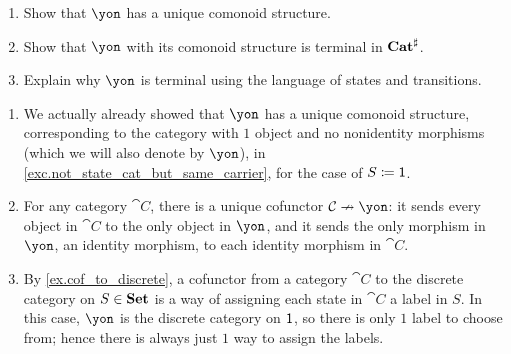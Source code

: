 \documentclass[Book-Poly]{subfiles}
\begin{document}
\begin{exercise}
\begin{enumerate}
	\item Show that $\yon$ has a unique comonoid structure.
	\item Show that $\yon$ with its comonoid structure is terminal in $\mathbf{Cat}^\sharp$.
	\item Explain why $\yon$ is terminal using the language of states and transitions.
\qedhere
\end{enumerate}
\begin{solution}
\begin{enumerate}
    \item We actually already showed that $\yon$ has a unique comonoid structure, corresponding to the category with $1$ object and no nonidentity morphisms (which we will also denote by $\yon$), in \cref{exc.not_state_cat_but_same_carrier}, for the case of $S\coloneqq\textsf{1}$.
    \item For any category $\cat{C}$, there is a unique cofunctor $\cat{C}\cof\yon$: it sends every object in $\cat{C}$ to the only object in $\yon$, and it sends the only morphism in $\yon$, an identity morphism, to each identity morphism in $\cat{C}$.
    \item By \cref{ex.cof_to_discrete}, a cofunctor from a category $\cat C$ to the discrete category on $S\in\mathbf{Set}$ is a way of assigning each state in $\cat C$ a label in $S$.
    In this case, $\yon$ is the discrete category on $\textsf{1}$, so there is only $1$ label to choose from; hence there is always just $1$ way to assign the labels.
\end{enumerate}
\end{solution}
\end{exercise}
\end{document}
